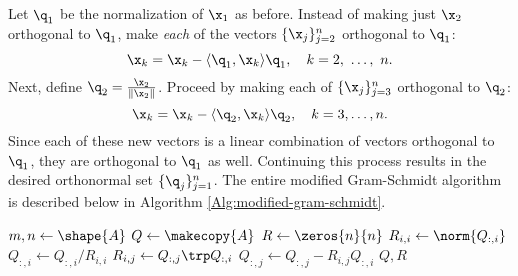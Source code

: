 Let $\q_1$ be the normalization of $\x_1$ as before.
Instead of making just $\x_2$ orthogonal to $\q_1$, make \emph{each} of the vectors $\{\x_j\}_{j=2}^n$ orthogonal to $\q_1$:
\[\x_k = \x_k - \langle \q_1,\x_{k} \rangle \q_1,\quad k=2,\ \ldots,\ n.\]
Next, define $\q_2 = \frac{\x_2}{\|\x_2\|}$.
Proceed by making each of $\{\x_j\}_{j=3}^n$ orthogonal to $\q_2$:
\[\x_k = \x_k - \langle \q_2,\x_{k} \rangle \q_2,\quad k=3,\ldots,n.\]
Since each of these new vectors is a linear combination of vectors orthogonal to $\q_1$, they are orthogonal to $\q_1$ as well.
Continuing this process results in the desired orthonormal set $\{\q_j\}_{j=1}^n$.
The entire modified Gram-Schmidt algorithm is described below in Algorithm \ref{Alg:modified-gram-schmidt}.

\begin{algorithm}[H]
\begin{algorithmic}[1]
    \State $m, n \gets \shape{A}$
    \State $Q \gets \makecopy{A}$
    \State $R \gets \zeros{n}{n}$
        \State $R_{i,i} \gets \norm{Q_{:,i}}$\label{step:mgs-normalize}
        \State $Q_{:,i} \gets Q_{:,i}/R_{i,i}$\label{step:mgs-mult1}
            \State $R_{i,j} \gets Q_{:,j}\trp  Q_{:,i}$\label{step:mgs-mult2}
            \State $Q_{:,j} \gets Q_{:,j}-R_{i,j}Q_{:,i}$\label{step:mgs-mult3}
        \EndFor
    \EndFor
    \State {} $Q, R$
\EndProcedure
\end{algorithmic}
\caption{}
\label{Alg:modified-gram-schmidt}
\end{algorithm}

